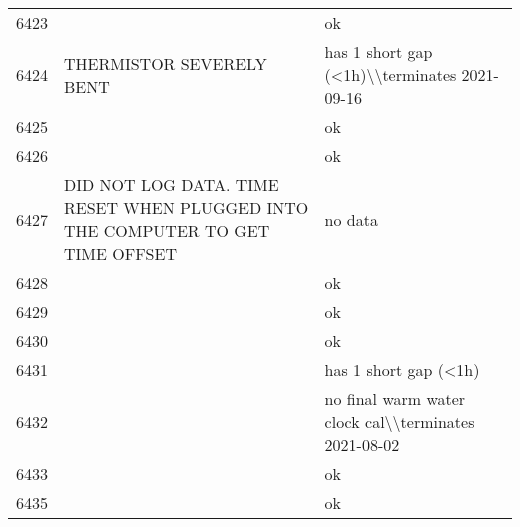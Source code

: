 \begin{longtable}{p{1cm}p{7cm}p{7cm}}
6423 &                                                                                 &                                                                                              ok \\
6424 &                                                        THERMISTOR SEVERELY BENT &                                                    has 1 short gap (<1h)\textbackslash \textbackslash terminates 2021-09-16 \\
6425 &                                                                                 &                                                                                              ok \\
6426 &                                                                                 &                                                                                              ok \\
6427 &  DID NOT LOG DATA. TIME RESET WHEN PLUGGED INTO THE COMPUTER TO GET TIME OFFSET &                                                                                         no data \\
6428 &                                                                                 &                                                                                              ok \\
6429 &                                                                                 &                                                                                              ok \\
6430 &                                                                                 &                                                                                              ok \\
6431 &                                                                                 &                                                                           has 1 short gap (<1h) \\
6432 &                                                                                 &                                            no final warm water clock cal\textbackslash \textbackslash terminates 2021-08-02 \\
6433 &                                                                                 &                                                                                              ok \\
6435 &                                                                                 &                                                                                              ok \\

\end{longtable}
